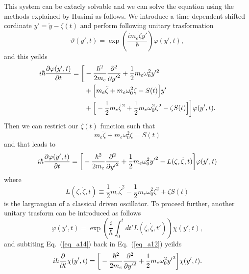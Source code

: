 This system can be extacly solvable and we can solve the equation using the methods explained by Husimi \cite{husmi53} as follows. We introduce a time dependent shifted cordinate $ y' = \tilde{y} - \zeta(t)$ and perform following unitary trasformation
\begin{equation} \label{eq_a9}
    \vartheta(y',t) = \exp(\frac{im_e\dot{\zeta}y'}{\hbar})\varphi(y',t),
\end{equation}
and this yeilds
\begin{equation} \label{eq_a10}
  \begin{aligned}
    i \hbar \pdv{\varphi(y',t)}{t}   =
    \bigg[
        & -  \frac{\hbar^2}{2m_e}\pdv[2]{{y'}}
        + \frac{1}{2} m_e \omega_0^2 y'^2 \\
        & +
        \Big[
            m_e\ddot{\zeta} + m_e\omega_0^2\zeta - S(t)
        \Big]y' \\
        &
        +
        \Big[
            - \frac{1}{2} m_e\dot{\zeta}^2 + \frac{1}{2}m_e\omega_0^2 \zeta^2 - \zeta S(t)
        \Big]
    \bigg]\varphi(y',t).
  \end{aligned}
\end{equation}
Then we can restrict our $\zeta(t)$ function such that
\begin{equation} \label{eq_a11}
  m_e\ddot{\zeta} + m_e\omega_0^2\zeta = S(t)
\end{equation}
and that leads to
\begin{equation} \label{eq_a12}
  \begin{aligned}
    i \hbar \pdv{\varphi(y',t)}{t}   =
    \bigg[
        -  \frac{\hbar^2}{2m_e}\pdv[2]{{y'}}
        + \frac{1}{2} m_e \omega_0^2 {y'}^2
        - L(\zeta,\dot{\zeta},t)
    \bigg]\varphi(y',t)
  \end{aligned}
\end{equation}
where
\begin{equation} \label{eq_a13}
  L(\zeta,\dot{\zeta},t) \equiv \frac{1}{2} m_e\dot{\zeta}^2 - \frac{1}{2}m_e\omega_0^2 \zeta^2 + \zeta S(t)
\end{equation}
is the largrangian of a classical driven oscillator. To proceed further, another unitary trasform can be introduced as follows
\begin{equation} \label{eq_a14}
    \varphi(y',t) = \exp(\frac{i}{\hbar}\int_0^{t}dt'L(\zeta,\dot{\zeta},t')) \chi(y',t),
\end{equation}
and subtiting Eq.~(\ref{eq_a14}) back in Eq.~(\ref{eq_a12}) yeilds
\begin{equation} \label{eq_a15}
    i \hbar \pdv{t} \chi(y',t)  =
    \bigg[
        -  \frac{\hbar^2}{2m_e}\pdv[2]{{y'}}
        + \frac{1}{2} m_e \omega_0^2 {y'}^2
    \bigg] \chi(y',t).
\end{equation}
